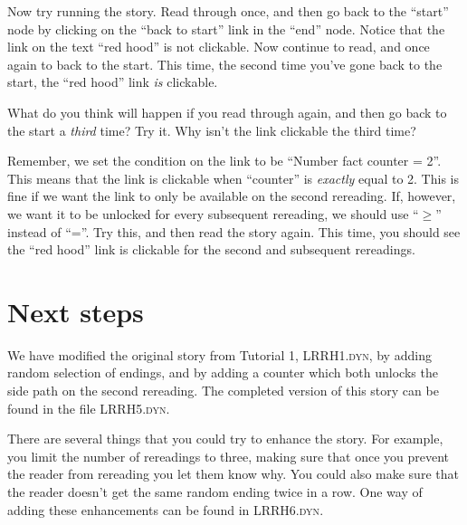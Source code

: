 \documentclass{article}
\begin{document}
Now try running the story. Read through once, and then go back to the 
``start'' node by clicking on the ``back to start'' link in the 
``end'' node. Notice that the link on the text ``red hood'' is not 
clickable. Now continue to read, and once again to back to the start. 
This time, the second time you've gone back to the start, the ``red 
hood'' link \textit{is} clickable.

What do you think will happen if you read through again, and then go 
back to the start a \textit{third} time? Try it. Why isn't the link 
clickable the third time?

Remember, we set the condition on the link to be ``Number fact 
counter = 2''. This means that the link is clickable when ``counter'' 
is \textit{exactly} equal to 2. This is fine if we want the link to 
only be available on the second rereading. If, however, we want it to 
be unlocked for every subsequent rereading, we should use ``$\ge$'' 
instead of ``=''. Try this, and then read the story again. This time, 
you should see the ``red hood'' link is clickable for the second and 
subsequent rereadings.



\section{Next steps}

We have modified the original story from Tutorial 1, 
\textsc{LRRH1.dyn}, by adding random selection of endings, and by 
adding a counter which both unlocks the side path on the second 
rereading. The completed version of this story can be found in the 
file \textsc{LRRH5.dyn}. 

There are several things that you could try to enhance the story. For example,
you limit the number of rereadings to three, making sure that once 
you prevent the reader from rereading you let them know why. You 
could also make sure that the reader doesn't get the same random 
ending twice in a row. One way of adding these enhancements can be 
found in \textsc{LRRH6.dyn}. 
\end{document}
